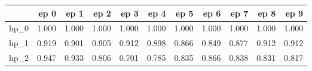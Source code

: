 \begin{tabular}{lrrrrrrrrrr}
\toprule
{} &   ep 0 &   ep 1 &   ep 2 &   ep 3 &   ep 4 &   ep 5 &   ep 6 &   ep 7 &   ep 8 &   ep 9 \\
\midrule
hp\_0 &  1.000 &  1.000 &  1.000 &  1.000 &  1.000 &  1.000 &  1.000 &  1.000 &  1.000 &  1.000 \\
hp\_1 &  0.919 &  0.901 &  0.905 &  0.912 &  0.898 &  0.866 &  0.849 &  0.877 &  0.912 &  0.912 \\
hp\_2 &  0.947 &  0.933 &  0.806 &  0.701 &  0.785 &  0.835 &  0.866 &  0.838 &  0.831 &  0.817 \\
\bottomrule
\end{tabular}
